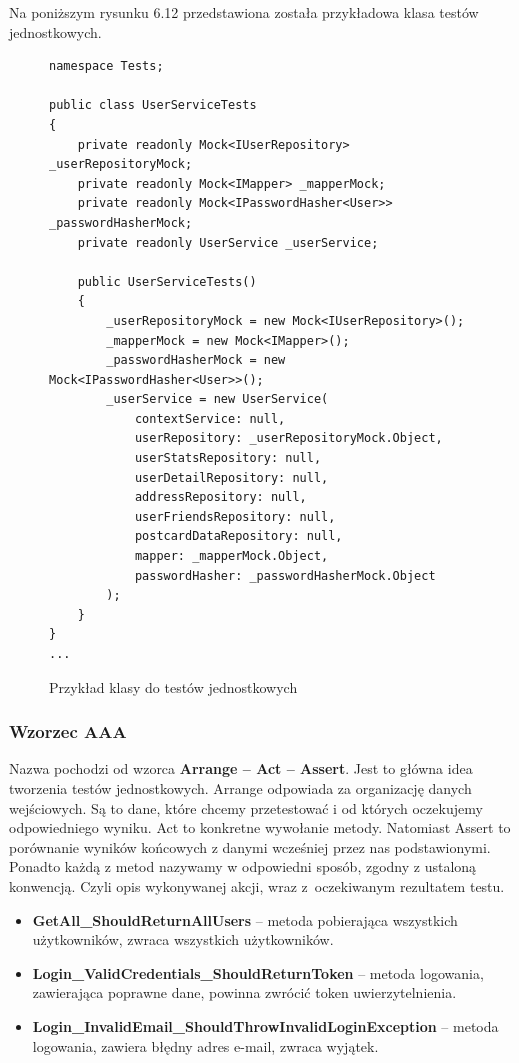 \documentclass[a4paper,twoside,12pt]{book}
\begin{document}
Na poniższym rysunku 6.12 przedstawiona została przykładowa klasa testów jednostkowych.
\newpage
    \begin{figure}[H]
        \begin{lstlisting}
namespace Tests;

public class UserServiceTests
{
    private readonly Mock<IUserRepository> _userRepositoryMock;
    private readonly Mock<IMapper> _mapperMock;
    private readonly Mock<IPasswordHasher<User>> _passwordHasherMock;
    private readonly UserService _userService;

    public UserServiceTests()
    {
        _userRepositoryMock = new Mock<IUserRepository>();
        _mapperMock = new Mock<IMapper>();
        _passwordHasherMock = new Mock<IPasswordHasher<User>>();
        _userService = new UserService(
            contextService: null,
            userRepository: _userRepositoryMock.Object,
            userStatsRepository: null,
            userDetailRepository: null,
            addressRepository: null,
            userFriendsRepository: null,
            postcardDataRepository: null,
            mapper: _mapperMock.Object,
            passwordHasher: _passwordHasherMock.Object
        );
    }
}
...
        \end{lstlisting}
    \caption{Przykład klasy do testów jednostkowych}
    \label{fig:pseudokod:listings}
    \end{figure}

\subsubsection{Wzorzec AAA}
Nazwa pochodzi od wzorca \textbf{Arrange -- Act -- Assert}. Jest to główna idea tworzenia testów jednostkowych. Arrange odpowiada za organizację danych wejściowych. Są to dane, które chcemy przetestować i od których oczekujemy odpowiedniego wyniku. Act to konkretne wywołanie metody. Natomiast Assert to porównanie wyników końcowych z danymi wcześniej przez nas podstawionymi. Ponadto każdą z metod nazywamy w odpowiedni sposób, zgodny z ustaloną konwencją. Czyli opis wykonywanej akcji, wraz z~oczekiwanym rezultatem testu.
\begin{itemize}
    \item \textbf{GetAll\_ShouldReturnAllUsers} -- metoda pobierająca wszystkich użytkowników, zwraca wszystkich użytkowników.
    \item \textbf{Login\_ValidCredentials\_ShouldReturnToken} -- metoda logowania, zawierająca poprawne dane, powinna zwrócić token uwierzytelnienia.
    \item \textbf{Login\_InvalidEmail\_ShouldThrowInvalidLoginException} -- metoda logowania, zawiera błędny adres e-mail, zwraca wyjątek.
\end{itemize}
\end{document}
